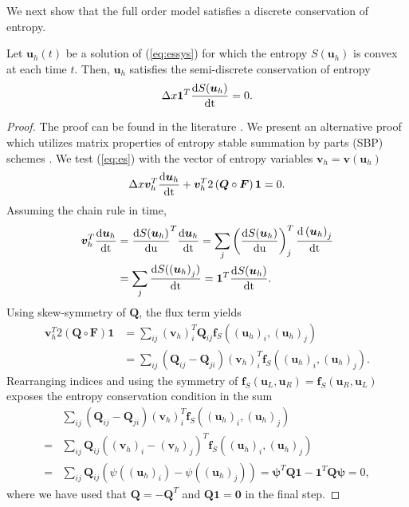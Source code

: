 \documentclass[review]{siamart171218}
\theoremstyle{assumption}
\newcommand{\td}[2]{\frac{{\rm d}#1}{{\rm d}{\rm #2}}}
\newcommand{\LRp}[1]{\left( #1 \right)}
\begin{document}
We next show that the full order model satisfies a discrete conservation of entropy.  
\begin{theorem}
\label{thm:ecfom}
Let $\bm{u}_h(t)$ be a solution of (\ref{eq:essys}) for which the entropy $S(\bm{u}_h)$ is convex at each time $t$.  Then, $\bm{u}_h$ satisfies the semi-discrete conservation of entropy 
\[
\Delta x \bm{1}^T\td{S(\bm{u}_h)}{t} = 0.
\]
\end{theorem}
\begin{proof}
The proof can be found in the literature \cite{tadmor1987numerical, tadmor2003entropy, tadmor2016entropy}.  We present an alternative proof which utilizes matrix properties of entropy stable summation by parts (SBP) schemes \cite{carpenter2014entropy, gassner2016split, chen2017entropy, crean2018entropy, chan2017discretely}.  We test (\ref{eq:es}) with the vector of entropy variables $\bm{v}_h = \bm{v}(\bm{u}_h)$
\[
\Delta x \bm{v}_h^T\td{\bm{u}_h}{t} + \bm{v}_h^T2\LRp{{\bm{Q}}\circ \bm{F}}\bm{1} = 0.
\]
Assuming the chain rule in time, 
\begin{align*}
\bm{v}_h^T\td{\bm{u}_h}{t} &= {\td{S(\bm{u}_h)}{\bm{u}}}^T\td{\bm{u}_h}{t} = \sum_j \LRp{\td{S(\bm{u}_h)}{\bm{u}}}_j^T\td{\LRp{\bm{u}_h}_j}{t} \\
&=  \sum_j \td{S(\LRp{\bm{u}_h}_j)}{t}  =  \bm{1}^T\td{S(\bm{u}_h)}{t}.
\end{align*}
Using skew-symmetry of $\bm{Q}$, the flux term yields
\begin{align*}
\bm{v}_h^T2\LRp{{\bm{Q}}\circ \bm{F}}\bm{1} &= \sum_{ij} \LRp{\bm{v}_h}_i^T \bm{Q}_{ij} \bm{f}_{S}\LRp{\LRp{\bm{u}_h}_i, \LRp{\bm{u}_h}_j} \\
&= \sum_{ij} \LRp{\bm{Q}_{ij}-\bm{Q}_{ji}} \LRp{\bm{v}_h}_i^T  \bm{f}_{S}\LRp{\LRp{\bm{u}_h}_i, \LRp{\bm{u}_h}_j}.
\end{align*}
Rearranging indices and using the symmetry of $\bm{f}_S(\bm{u}_L,\bm{u}_R) = \bm{f}_S(\bm{u}_R,\bm{u}_L)$ exposes the entropy conservation condition in the sum
\begin{align*}
&\sum_{ij} \LRp{\bm{Q}_{ij}-\bm{Q}_{ji}} \LRp{\bm{v}_h}_i^T \bm{f}_{S}\LRp{\LRp{\bm{u}_h}_i, \LRp{\bm{u}_h}_j} \\
=&\sum_{ij} \bm{Q}_{ij} \LRp{\LRp{\bm{v}_h}_i-\LRp{\bm{v}_h}_j}^T  \bm{f}_{S}\LRp{\LRp{\bm{u}_h}_i, \LRp{\bm{u}_h}_j}\\
=&\sum_{ij} \bm{Q}_{ij} \LRp{\psi\LRp{\LRp{\bm{u}_h}_i} - \psi(\LRp{\bm{u}_h}_j)} = \bm{\psi}^T\bm{Q}\bm{1}-\bm{1}^T\bm{Q}\bm{\psi} = 0,
\end{align*}
where we have used that $\bm{Q}=-\bm{Q}^T$ and $\bm{Q}\bm{1} = \bm{0}$ in the final step.

\end{proof}
\end{document}
